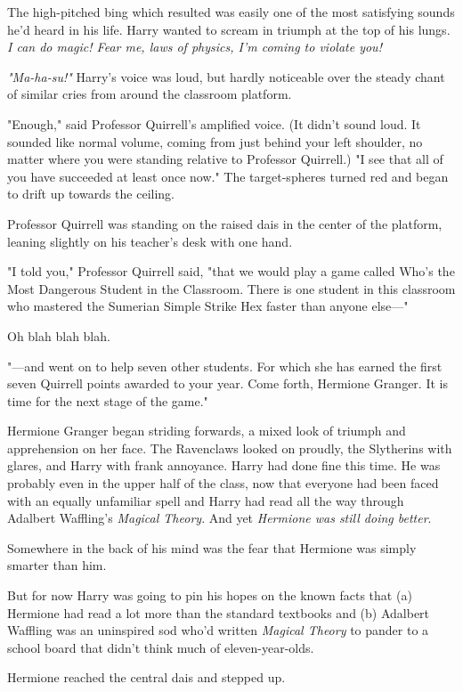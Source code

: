 The high-pitched bing which resulted was easily one of the most satisfying
sounds he'd heard in his life. Harry wanted to scream in triumph at the top of
his lungs. \emph{I can do magic! Fear me, laws of physics, I'm coming to
violate you!}

\emph{"Ma-ha-su!"} Harry's voice was loud, but hardly noticeable over the
steady chant of similar cries from around the classroom platform.

"Enough," said Professor Quirrell's amplified voice. (It didn't sound loud. It
sounded like normal volume, coming from just behind your left shoulder, no
matter where you were standing relative to Professor Quirrell.) "I see that all
of you have succeeded at least once now." The target-spheres turned red and
began to drift up towards the ceiling.

Professor Quirrell was standing on the raised dais in the center of the
platform, leaning slightly on his teacher's desk with one hand.

"I told you," Professor Quirrell said, "that we would play a game called Who's
the Most Dangerous Student in the Classroom. There is one student in this
classroom who mastered the Sumerian Simple Strike Hex faster than anyone
else\mbox{---}"

Oh blah blah blah.

"---and went on to help seven other students. For which she has earned the
first seven Quirrell points awarded to your year. Come forth, Hermione Granger.
It is time for the next stage of the game."

Hermione Granger began striding forwards, a mixed look of triumph and
apprehension on her face. The Ravenclaws looked on proudly, the Slytherins with
glares, and Harry with frank annoyance. Harry had done fine this time. He was
probably even in the upper half of the class, now that everyone had been faced
with an equally unfamiliar spell and Harry had read all the way through
Adalbert Waffling's \emph{Magical Theory}. And yet \emph{Hermione was still
doing better}.

Somewhere in the back of his mind was the fear that Hermione was simply smarter
than him.

But for now Harry was going to pin his hopes on the known facts that (a)
Hermione had read a lot more than the standard textbooks and (b) Adalbert
Waffling was an uninspired sod who'd written \emph{Magical Theory} to pander to
a school board that didn't think much of eleven-year-olds.

Hermione reached the central dais and stepped up.

